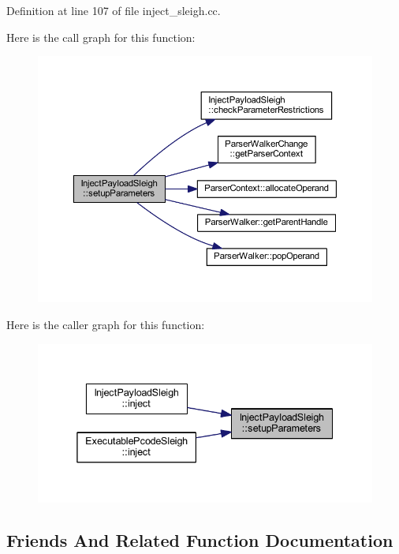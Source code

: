 Definition at line 107 of file inject\+\_\+sleigh.\+cc.

Here is the call graph for this function\+:
\nopagebreak
\begin{figure}[H]
\begin{center}
\leavevmode
\includegraphics[width=350pt]{class_inject_payload_sleigh_a2e0e17d52688e5404b7133d122b2e8aa_cgraph}
\end{center}
\end{figure}
Here is the caller graph for this function\+:
\nopagebreak
\begin{figure}[H]
\begin{center}
\leavevmode
\includegraphics[width=338pt]{class_inject_payload_sleigh_a2e0e17d52688e5404b7133d122b2e8aa_icgraph}
\end{center}
\end{figure}


\subsection{Friends And Related Function Documentation}
\mbox{\label{class_inject_payload_sleigh_a66b43a88911f518d0a761ebd9375c30f}} 
